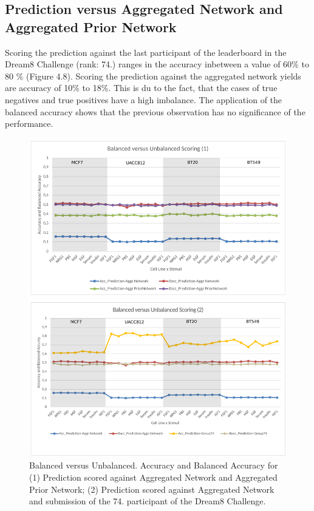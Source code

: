 \subsection*{Prediction versus Aggregated Network and Aggregated Prior Network}
Scoring the prediction against the last participant of the leaderboard in the Dream8 Challenge (rank: 74.) ranges in the accuracy inbetween a value of 60\% to 80 \% (Figure 4.8). Scoring the prediction against the aggregated network yields are accuracy of 10\% to 18\%. This is du to the fact, that the cases of true negatives and true positives have a high imbalance. The application of the balanced accuracy shows that the previous observation has no significance of the performance.  
\begin{figure}[H]
\centering
\includegraphics[width=1.0\textwidth]{./Bilder/Scoring/dreamchallenge/1_Balanced_vs_Unbalanced/balanced.pdf}
\caption[Blanced vs. Unbalanced]{Balanced versus Unbalanced. Accuracy and Balanced Accuracy for (1) Prediction scored against Aggregated Network and Aggregated Prior Network; (2) Prediction scored against Aggregated Network  and submission of the 74. participant of the Dream8 Challenge.}
\label{fig:10}
\end{figure}

